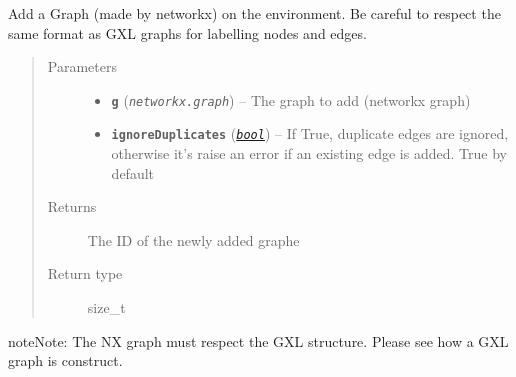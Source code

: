 \documentclass[letterpaper,10pt,english]{sphinxmanual}
\begin{document}

\begin{fulllineitems}
\label{doc:PythonGedLib.addNxGraph}
Add a Graph (made by networkx) on the environment. Be careful to respect the same format as GXL graphs for labelling nodes and edges.
\begin{quote}\begin{description}
\item[{Parameters}] \leavevmode\begin{itemize}
\item {} 
\textbf{\texttt{g}} (\emph{\texttt{networkx.graph}}) -- The graph to add (networkx graph)

\item {} 
\textbf{\texttt{ignoreDuplicates}} (\href{https://docs.python.org/3/library/functions.html\#bool}{\emph{\texttt{bool}}}) -- If True, duplicate edges are ignored, otherwise it's raise an error if an existing edge is added. True by default

\end{itemize}

\item[{Returns}] \leavevmode
The ID of the newly added graphe

\item[{Return type}] \leavevmode
size\_t

\end{description}\end{quote}

\begin{notice}{note}{Note:}
The NX graph must respect the GXL structure. Please see how a GXL graph is construct.
\end{notice}

\end{fulllineitems}

\end{document}
